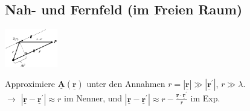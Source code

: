 \documentclass[english]{latex4ei/latex4ei_sheet}
\renewcommand{\vec}[1]{\underline{\boldsymbol{#1}}}
\begin{document}
\begin{sectionbox}
	\subsection{Nah- und Fernfeld (im Freien Raum)}
	
	\begin{center}\includegraphics[width = 2.3cm]{./img/fernfeld.png}\end{center}

	Approximiere $\vec{A}(\vec{r})$ unter den Annahmen $r = |\vec{r}|\gg |\vec{r}^{\prime}|$, $r \gg \lambda$.\\
	$\rightarrow$ $|\vec{r} - \vec{r}^{\prime}| \approx r$ im Nenner, und $|\vec{r} - \vec{r}^{\prime}| \approx r - \frac{\vec{r}\cdot\vec{r}^{\prime}}{r}$ im Exp.\\


\end{sectionbox}
\end{document}
